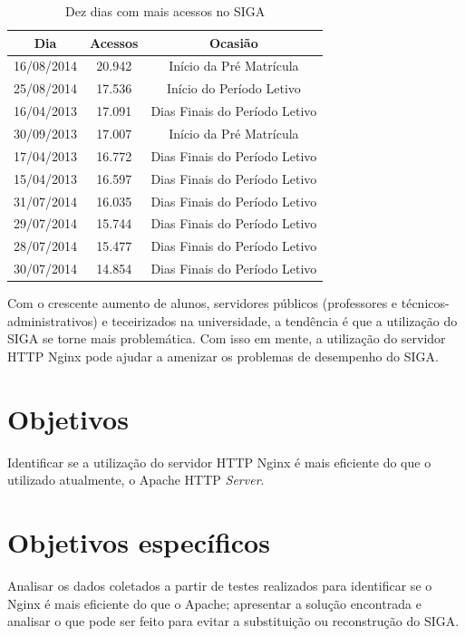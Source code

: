 \begin{table}[htb]
	\centering
	\ABNTEXfontereduzida
	\caption{Dez dias com mais acessos no SIGA}
	\label{tab:top10acessos}
	\begin{tabular}{|c|c|c|}
		\hline
		\textbf{Dia} & \textbf{Acessos}  & \textbf{Ocasião} \\ \hline
		16/08/2014 & 20.942 & Início da Pré Matrícula \\ \hline
		25/08/2014 & 17.536 & Início do Período Letivo \\ \hline
		16/04/2013 & 17.091 & Dias Finais do Período Letivo \\ \hline
		30/09/2013 & 17.007 & Início da Pré Matrícula \\ \hline
		17/04/2013 & 16.772 & Dias Finais do Período Letivo \\ \hline
		15/04/2013 & 16.597 & Dias Finais do Período Letivo \\ \hline
		31/07/2014 & 16.035 & Dias Finais do Período Letivo \\ \hline
		29/07/2014 & 15.744 & Dias Finais do Período Letivo \\ \hline
		28/07/2014 & 15.477 & Dias Finais do Período Letivo \\ \hline
		30/07/2014 & 14.854 & Dias Finais do Período Letivo \\ \hline
	\end{tabular}
\end{table}
Com o crescente aumento de alunos, servidores públicos (professores e 
técnicos-administrativos) e teceirizados na universidade, a tendência é que a 
utilização do SIGA se torne mais problemática.
Com isso em mente, a utilização do servidor HTTP Nginx pode ajudar a amenizar 
os problemas de desempenho do SIGA.\\
\section{Objetivos}
Identificar se a utilização do servidor HTTP Nginx é mais eficiente do que o 
utilizado atualmente, o Apache HTTP \textit{Server}.\\
\section{Objetivos específicos}
Analisar os dados coletados a partir de testes realizados para identificar se o 
Nginx é mais eficiente do que o Apache; apresentar a solução encontrada e 
analisar o que pode ser feito para evitar a substituição ou reconstrução do 
SIGA.\\
